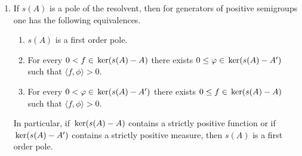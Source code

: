 \begin{remarks}\label{rem:b3-2.15}
%
	
	\begin{enumerate}[\upshape (i), wide, labelindent=.25em]
	\item
	If\/ $s(A)$ is a pole of the resolvent, then for generators of positive semigroups one has the following equivalences.%
	
	\begin{enumerate}[\upshape (a)]
		\item 
		$s(A)$ is a first order pole.
		
		\item 
		For every $0 < f \in \mathop{}\mathrm{ker}(s(A) - A)$ there exists $0 \leq \phi \in \Kern{s(A) - A'}$ such that $\langle f,\phi \rangle > 0$.
		
		\item 
		For every $0 < \phi \in \Kern{s(A) - A'}$ there exists $0 \leq f \in \Kern{s(A) - A}$ such that $\langle f,\phi \rangle > 0$.
	\end{enumerate}
	In particular, if\/ $\mathop{}\mathrm{ker}(s(A) - A)$ contains a strictly positive function or if\/ $\mathop{}\mathrm{ker}(s(A) - A')$ contains a strictly positive measure, then $s(A)$ is a first order pole.


\end{enumerate}
\end{remarks}
